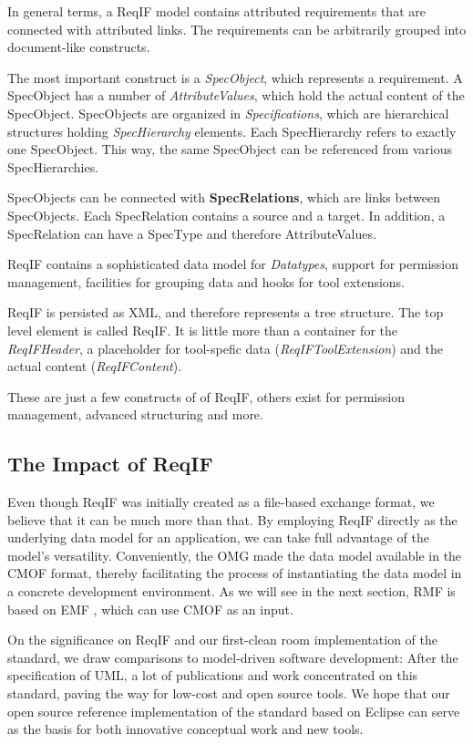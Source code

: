 \documentclass{template/openetcs_report}
\begin{document}
In general terms, a ReqIF model contains attributed requirements that are connected with attributed links.  The requirements can be arbitrarily grouped into document-like constructs.

The most important construct is a {\em SpecObject}, which represents a requirement. A SpecObject has a number of {\em AttributeValues}, which hold the actual content of the SpecObject. SpecObjects are organized in {\em Specifications}, which are hierarchical structures holding {\em SpecHierarchy} elements. Each SpecHierarchy refers to exactly one SpecObject. This way, the same SpecObject can be referenced from various SpecHierarchies.

SpecObjects can be connected with \textbf{SpecRelations}, which are links between SpecObjects. Each SpecRelation contains a source and a target.  In addition, a SpecRelation can have a SpecType and therefore AttributeValues.

ReqIF contains a sophisticated data model for {\em Datatypes}, support for permission management, facilities for grouping data and hooks for tool extensions.

ReqIF is persisted as XML, and therefore represents a tree structure.  The top level element is called ReqIF.  It is little more than a container for the \emph{ReqIFHeader}, a placeholder for tool-spefic data (\emph{ReqIFToolExtension}) and the actual content (\emph{ReqIFContent}).

These are just a few constructs of of ReqIF, others exist for permission management, advanced structuring and more.

\subsection{The Impact of ReqIF}

Even though ReqIF was initially created as a file-based exchange format, we believe that it can be much more than that.  By employing ReqIF directly as the underlying data model for an application, we can take full advantage of the model's versatility.  Conveniently, the OMG made the data model available in the CMOF format, thereby facilitating the process of instantiating the data model in a concrete development environment.  As we will see in the next section, RMF is based on EMF \cite{emf}, which can use CMOF as an input.

On the significance on ReqIF and our first-clean room implementation of the standard, we draw comparisons to model-driven software development: After the specification of UML, a lot of publications and work concentrated on this standard, paving the way for low-cost and open source tools. We hope that our open source reference implementation of the standard based on Eclipse can serve as the basis for both innovative conceptual work and new tools.
\end{document}
